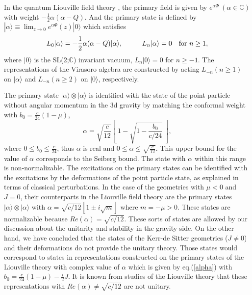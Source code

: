 \documentclass[a4paper,11pt]{article}
\begin{document}
In the quantum Liouville field theory \cite{Seiberg, Teschner}, 
the primary field is given by 
$e^{\alpha\Phi} \ (\alpha\in\mathbb{C})$ with weight 
$-\frac{1}{2}\alpha(\alpha-Q)$. 
And the primary state is defined by 
$\displaystyle{|\alpha\rangle \equiv \lim_{z\rightarrow 0}e^{\alpha\Phi}(z)|0\rangle}$ 
which satisfies
\begin{equation}
L_0|\alpha\rangle = 
   -\frac{1}{2}\alpha(\alpha-Q)|\alpha\rangle,
\hspace{10mm}
L_n|\alpha\rangle = 0 \ \ \ \mbox{for} \ n\geq 1,
\end{equation}
where $|0\rangle$ is the SL(2;$\mathbb{C}$) invariant vacuum, 
$L_n|0\rangle =0$ for $n\geq-1$.
The representations of the Virasoro algebra are constructed by acting 
$L_{-n} (n\geq 1)$ on $|\alpha\rangle$ and $L_{-n} (n\geq 2)$ on
$|0\rangle$, respectively. 

The primary state $|\alpha\rangle\otimes|\alpha\rangle$ is identified 
with the state of the point particle without angular momentum 
in the 3d gravity by matching the conformal weight with 
$b_0=\frac{c}{24}(1-\mu)$, 
\begin{equation}
 \label{alpha}
 \alpha=\sqrt{\frac{c}{12}}\left[ \ 1-\sqrt{1-\frac{b_0}{c/24}} \ \right], 
\end{equation}
where $0\leq b_0 \leq \frac{c}{24}$, thus $\alpha$ is real 
and $0 \leq \alpha \leq \sqrt{\frac{c}{12}}$. 
This upper bound for the value of $\alpha$ corresponds to the Seiberg
bound. The state with $\alpha$ within this range is non-normalizable.
The excitations on the primary states can be identified with 
the excitations by the deformations of the point particle state, 
as explained in terms of classical perturbations.
In the case of the geometries with $\mu<0$ and $J=0$, 
their counterparts in the Liouville field theory are the primary states 
$|\alpha\rangle\otimes|\alpha\rangle$ with 
$\alpha=\sqrt{c/12}\left[1\pm i\sqrt{m}\right]$ where $m=-\mu>0$.
These states are normalizable because $Re(\alpha)=\sqrt{c/12}$.
These sorts of states are allowed by our discussion about 
the unitarity and stability in the gravity side.
On the other hand, we have concluded that the states of the Kerr-de Sitter 
geometries ($J\neq 0$) and their deformations do not provide 
the unitary theory.
Those states would correspond to states in representations constructed on 
the primary states of the Liouville theory with complex value of $\alpha$ 
which is given by eq.(\ref{alpha}) with 
$b_0=\frac{c}{24}(1-\mu)-\frac{i}{2}J$.
It is known from studies of the Liouville theory 
that these representations with $Re(\alpha)\neq\sqrt{c/12}$ are 
not unitary.  
\end{document}
